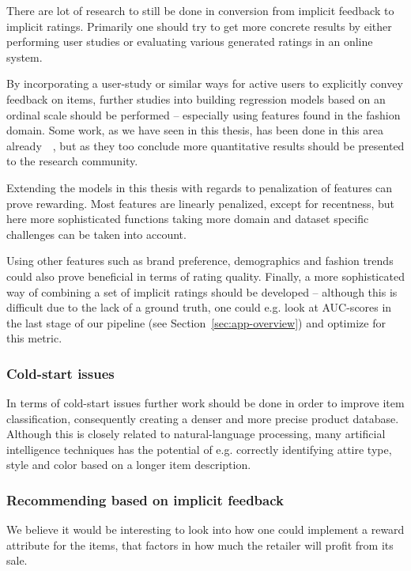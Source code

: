 There are lot of research to still be done in conversion from implicit feedback
to implicit ratings. Primarily one should try to get more concrete results by
either performing user studies or evaluating various generated ratings in an
online system.

By incorporating a user-study or similar ways for active users to explicitly
convey feedback on items, further studies into building regression models based
on an ordinal scale should be performed -- especially using features found in
the fashion domain. Some work, as we have seen in this thesis, has been done in
this area already~\cite{parra2011walk}~\cite{parra2011implicit}, but as they
too conclude more quantitative results should be presented to the research
community.

Extending the models in this thesis with regards to penalization of features
can prove rewarding. Most features are linearly penalized, except for
recentness, but here more sophisticated functions taking more domain and
dataset specific challenges can be taken into account.

Using other features such as brand preference, demographics and fashion trends
could also prove beneficial in terms of rating quality. Finally, a more
sophisticated way of combining a set of implicit ratings should be developed --
although this is difficult due to the lack of a ground truth, one could e.g.
look at AUC-scores in the last stage of our pipeline (see
Section~\ref{sec:app-overview}) and optimize for this metric.

\subsubsection{Cold-start issues}

In terms of cold-start issues further work should be done in order to improve
item classification, consequently creating a denser and more precise product
database. Although this is closely related to natural-language processing, many
artificial intelligence techniques has the potential of e.g. correctly
identifying attire type, style and color based on a longer item description.

\subsubsection{Recommending based on implicit feedback}

We believe it would be interesting to look into how one could implement a
reward attribute for the items, that factors in how much the retailer will
profit from its sale.

